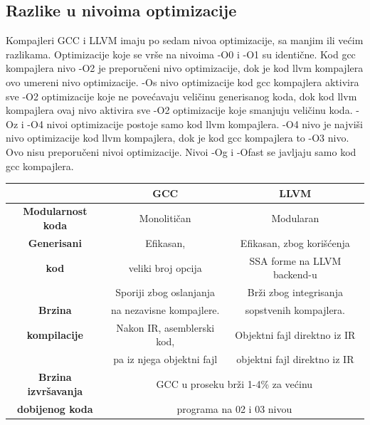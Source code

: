 \documentclass[a4paper]{article}
\begin{document}
\subsection{Razlike u nivoima optimizacije}
\label{subsec:nivoiRazlika}
Kompajleri GCC i LLVM imaju po sedam nivoa optimizacije, sa manjim ili većim razlikama. 
Optimizacije koje se vrše na nivoima -O0 i -O1 su identične. Kod gcc kompajlera nivo -O2 je preporučeni nivo optimizacije, dok je kod llvm kompajlera ovo umereni nivo optimizacije. -Os nivo optimizacije kod gcc kompajlera aktivira sve -O2 optimizacije koje ne povećavaju veličinu generisanog koda, dok kod llvm kompajlera ovaj nivo aktivira sve -O2 optimizacije koje smanjuju veličinu koda. -Oz i -O4 nivoi optimizacije postoje samo kod llvm kompajlera. -O4 nivo je najviši nivo optimizacije kod llvm kompajlera, dok je kod gcc kompajlera to -O3 nivo. Ovo nisu preporučeni nivoi optimizacije. Nivoi -Og i -Ofast se javljaju samo kod gcc kompajlera.
\\

\vspace{2em}
\hspace{-5em}
\begin{tabular}{|c|c|c|}
  \toprule
   & \textbf{GCC} & \textbf{LLVM} \\
  \midrule
  \textbf{Modularnost koda} & Monolitičan & Modularan \\
  \midrule
  \textbf{Generisani} & Efikasan, & Efikasan, zbog korišćenja \\
  \textbf{kod} & veliki broj opcija &  SSA forme na LLVM backend-u \\
  \midrule
  {} & Sporiji zbog oslanjanja  & Brži zbog integrisanja  \\  
  \textbf{Brzina} & na nezavisne kompajlere.  & sopstvenih kompajlera. \\  
  \textbf{kompilacije} & Nakon IR, asemblerski kod, & Objektni fajl direktno iz IR \\  
  {} & pa iz njega objektni fajl & objektni fajl direktno iz IR \\  
  \midrule
  \textbf{Brzina izvršavanja} &   \multicolumn{2}{|c|}{GCC u proseku brži 1-4\%  za većinu} \\
  \textbf{dobijenog koda}     &   \multicolumn{2}{|c|}{programa na 02 i 03 nivou}  \\  
  \bottomrule
  \end{tabular}

  \vspace{2em}
  

\end{document}
